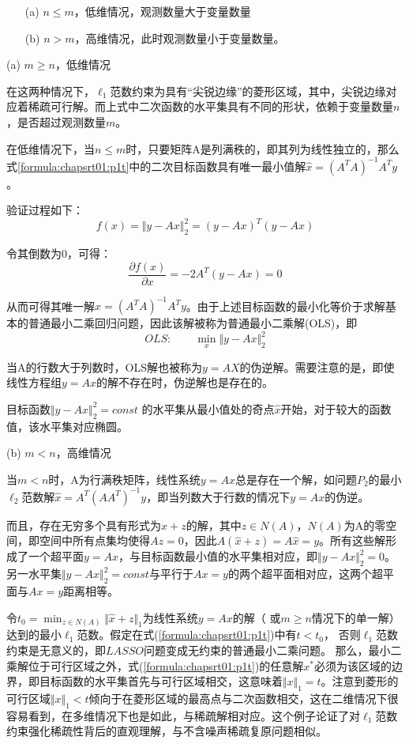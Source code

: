 \begin{enumerate}
	\item  [(a)]  $ n\leq m $，低维情况，观测数量大于变量数量
	\item  [(b)]  $ n>m $，高维情况，此时观测数量小于变量数量。
\end{enumerate}

(a)  $ m \geq n $，低维情况


在这两种情况下，$ \ell_1 $范数约束为具有“尖锐边缘”的菱形区域，其中，尖锐边缘对应着稀疏可行解。而上式中二次函数的水平集具有不同的形状，依赖于变量数量$ n $，是否超过观测数量$ m $。

在低维情况下，当$ n\leq m $时，只要矩阵A是列满秩的，即其列为线性独立的，那么式\ref{formula:chapsrt01:p1t}中的二次目标函数具有唯一最小值解$ \hat{x} =(A^TA)^{-1}A^T y $。

验证过程如下：
\begin{equation*}\label{key}
f(x)       =         \Vert y-Ax \Vert_2^2 = (y-Ax)^{T}(y-Ax)    
\end{equation*}

令其倒数为0，可得：
\begin{equation*}\label{key}
\dfrac{\partial f(x)}{\partial x}  = -2A^T(y-Ax) =0
\end{equation*}

从而可得其唯一解$ \hat{x} =(A^TA)^{-1}A^T y $。由于上述目标函数的最小化等价于求解基本的普通最小二乘回归问题，因此该解被称为普通最小二乘解(OLS)，即
$$   OLS:\qquad  \min_{x}  \Vert y-Ax \Vert^2_2$$

当A的行数大于列数时，OLS解也被称为$ y=AX $的伪逆解。需要注意的是，即使线性方程组$ y =Ax $的解不存在时，伪逆解也是存在的。

目标函数$ \Vert y-Ax \Vert^2_2 =const $ 的水平集从最小值处的奇点$ \hat{x} $开始，对于较大的函数值，该水平集对应椭圆。

(b) $m<n $，高维情况

当$ m<n $时，A为行满秩矩阵，线性系统$ y=Ax $总是存在一个解，如问题$ P_{2} $的最小$ \ell_2 $范数解$\hat{x}=A^T (AA^T)^{-1}y $，即当列数大于行数的情况下$ y=Ax $的伪逆。

而且，存在无穷多个具有形式为$ \hat{x} +z $的解，其中$ z\in N(A) $，$ N(A) $为A的零空间，即空间中所有点集均使得$ Az=0 $，因此$ A(\hat{x}+z)=A\hat{x} =y$。所有这些解形成了一个超平面$ y=Ax $，与目标函数最小值的水平集相对应，即$ \Vert y-Ax\Vert_2^2 =0$。另一水平集$\Vert y-Ax\Vert_2^2 =const$与平行于$ Ax=y $的两个超平面相对应，这两个超平面与$ Ax=y $距离相等。


令$ t_0 =\min_{z\in N(A)} \Vert \hat{x}+z\Vert_1 $为线性系统$ y=Ax $的解（{\color{red} 或$ m\geq n $情况下的单一解}）达到的最小$ \ell_1 $范数。假定在式(\ref{formula:chapsrt01:p1t})中有$ t<t_0 $，{\color{red} 否则$ \ell_1 $范数约束是无意义的，即$ LASSO $问题变成无约束的普通最小二乘问题。}
那么，最小二乘解位于可行区域之外，式(\ref{formula:chapsrt01:p1t})的任意解$ x^* $必须为该区域的边界，即目标函数的水平集首先与可行区域相交，这意味着$ \Vert x\Vert_1 =t$。注意到菱形的可行区域$ \Vert x\Vert_1 <t $倾向于在菱形区域的最高点与二次函数相交，这在二维情况下很容易看到，在多维情况下也是如此，与稀疏解相对应。这个例子论证了对$ \ell_1 $范数约束强化稀疏性背后的直观理解，与不含噪声稀疏复原问题相似。


